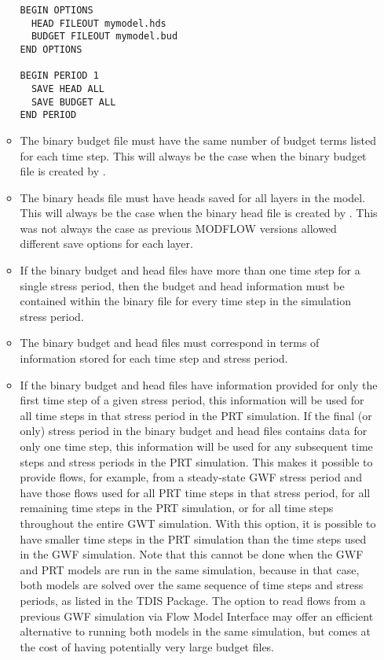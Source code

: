 \begin{itemize}
\begin{itemize}
\begin{verbatim}
BEGIN OPTIONS
  HEAD FILEOUT mymodel.hds
  BUDGET FILEOUT mymodel.bud
END OPTIONS

BEGIN PERIOD 1
  SAVE HEAD ALL
  SAVE BUDGET ALL
END PERIOD
\end{verbatim}

\item The binary budget file must have the same number of budget terms listed for each time step.  This will always be the case when the binary budget file is created by \mf.
\item The binary heads file must have heads saved for all layers in the model.  This will always be the case when the binary head file is created by \mf.  This was not always the case as previous MODFLOW versions allowed different save options for each layer.
\item If the binary budget and head files have more than one time step for a single stress period, then the budget and head information must be contained within the binary file for every time step in the simulation stress period.
\item The binary budget and head files must correspond in terms of information stored for each time step and stress period.
\item If the binary budget and head files have information provided for only the first time step of a given stress period, this information will be used for all time steps in that stress period in the PRT simulation. If the final (or only) stress period in the binary budget and head files contains data for only one time step, this information will be used for any subsequent time steps and stress periods in the PRT simulation. This makes it possible to provide flows, for example, from a steady-state GWF stress period and have those flows used for all PRT time steps in that stress period, for all remaining time steps in the PRT simulation, or for all time steps throughout the entire GWT simulation. With this option, it is possible to have smaller time steps in the PRT simulation than the time steps used in the GWF simulation. Note that this cannot be done when the GWF and PRT models are run in the same simulation, because in that case, both models are solved over the same sequence of time steps and stress periods, as listed in the TDIS Package. The option to read flows from a previous GWF simulation via Flow Model Interface may offer an efficient alternative to running both models in the same simulation, but comes at the cost of having potentially very large budget files.
\end{itemize}

\end{itemize}


